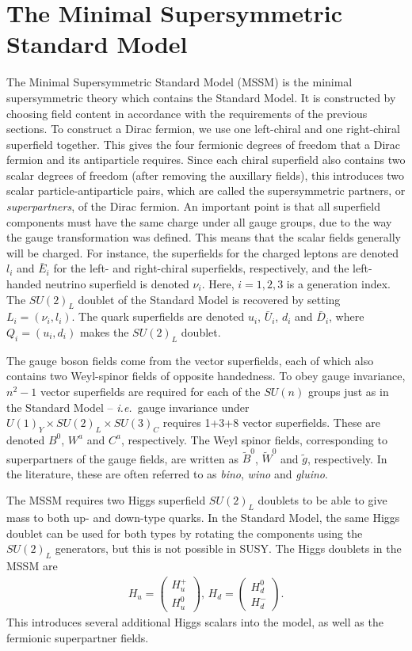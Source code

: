 \documentclass[twoside,english]{uiofysmaster}
\begin{document}
\section{The Minimal Supersymmetric Standard Model}
The Minimal Supersymmetric Standard Model (MSSM) is the minimal supersymmetric theory which contains the Standard Model. It is constructed by choosing field content in accordance with the requirements of the previous sections. To construct a Dirac fermion, we use one left-chiral and one right-chiral superfield together. This gives the four fermionic degrees of freedom that a Dirac fermion and its antiparticle requires. Since each chiral superfield also contains two scalar degrees of freedom (after removing the auxillary fields), this introduces two scalar particle-antiparticle pairs, which are called the supersymmetric partners, or {\it superpartners}, of the Dirac fermion. An important point is that all superfield components must have the same charge under all gauge groups, due to the way the gauge transformation was defined. This means that the scalar fields generally will be charged. For instance, the superfields for the charged leptons are denoted $l_i$ and $\bar E_i$ for the left- and right-chiral superfields, respectively, and the left-handed neutrino superfield is denoted $\nu_i$. Here, $i=1,2,3$ is a generation index. The $SU(2)_L$ doublet of the Standard Model is recovered by setting $L_i = (\nu_i, l_i)$. The quark superfields are denoted $u_i$, $\bar U_i$, $d_i$ and $\bar D_i$, where $Q_i = (u_i, d_i)$ makes the $SU(2)_L$ doublet.

The gauge boson fields come from the vector superfields, each of which also contains two Weyl-spinor fields of opposite handedness. To obey gauge invariance, $n^2-1$ vector superfields are required for each of the $SU(n)$ groups just as in the Standard Model -- {\it i.e.}\ gauge invariance under $U(1)_Y\times SU(2)_L \times SU(3)_C$ requires 1+3+8 vector superfields. These are denoted $B^0$, $W^a$ and $C^a$, respectively. The Weyl spinor fields, corresponding to superpartners of the gauge fields, are written as $\tilde B^0$, $\tilde W^0$ and $\tilde g$, respectively. In the literature, these are often referred to as {\it bino}, {\it wino} and {\it gluino}. 

The MSSM requires two Higgs superfield $SU(2)_L$ doublets to be able to give mass to both up- and down-type quarks. In the Standard Model, the same Higgs doublet can be used for both types by rotating the components using the $SU(2)_L$ generators, but this is not possible in SUSY. The Higgs doublets in the MSSM are
\begin{align}
	H_u = \begin{pmatrix}
		H_u^+ \\ H_u^0
	\end{pmatrix}, \, H_d = \begin{pmatrix}
		H_d^0 \\ H_d^-
	\end{pmatrix}.
\end{align}
This introduces several additional Higgs scalars into the model, as well as the fermionic superpartner fields.
\end{document}
